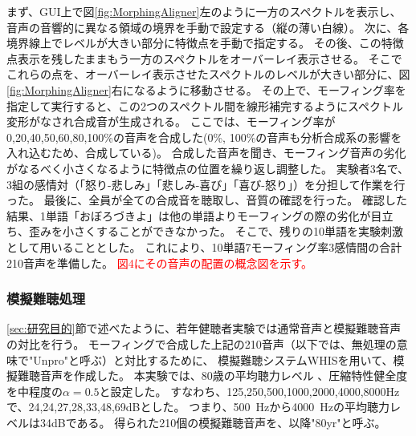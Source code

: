まず、GUI上で図\ref{fig:MorphingAligner}左のように一方のスペクトルを表示し、音声の音響的に異なる領域の境界を手動で設定する（縦の薄い白線）。
次に、各境界線上でレベルが大きい部分に特徴点を手動で指定する。
その後、この特徴点表示を残したままもう一方のスペクトルをオーバーレイ表示させる。
そこでこれらの点を、オーバーレイ表示させたスペクトルのレベルが大きい部分に、図\ref{fig:MorphingAligner}右になるように移動させる。
その上で、モーフィング率を指定して実行すると、この2つのスペクトル間を線形補完するようにスペクトル変形がなされ合成音が生成される。
ここでは、モーフィング率が 0,20,40,50,60,80,100\%の音声を合成した(0\%, 100\%の音声も分析合成系の影響を入れ込むため、合成している)。
合成した音声を聞き、モーフィング音声の劣化がなるべく小さくなるように特徴点の位置を繰り返し調整した。
実験者3名で、3組の感情対（「怒り-悲しみ」「悲しみ-喜び」「喜び-怒り」）を分担して作業を行った。
最後に、全員が全ての合成音を聴取し、音質の確認を行った。
確認した結果、1単語「おぼろづきよ」は他の単語よりモーフィングの際の劣化が目立ち、歪みを小さくすることができなかった。
そこで、残りの10単語を実験刺激として用いることとした。
これにより、10単語\time 7モーフィング率\time 3感情間の合計210音声を準備した。
\textcolor{red}{図4にその音声の配置の概念図を示す。}






\subsubsection{模擬難聴処理}

\ref{sec:研究目的}節で述べたように、若年健聴者実験では通常音声と模擬難聴音声の対比を行う。
モーフィングで合成した上記の210音声（以下では、無処理の意味で"Unpro"と呼ぶ）と対比するために、
模擬難聴システムWHIS\cite{irino2023hearing}を用いて、模擬難聴音声を作成した。
本実験では、80歳の平均聴力レベル \cite{tsuiki2002nihon_Jpn}、圧縮特性健全度を中程度の$\alpha=0.5$と設定した。
すなわち、125,250,500,1000,2000,4000,8000Hzで、24,24,27,28,33,48,69dBとした。
つまり、500~Hzから4000~Hzの平均聴力レベルは34dBである。
得られた210個の模擬難聴音声を、以降"80yr"と呼ぶ。


